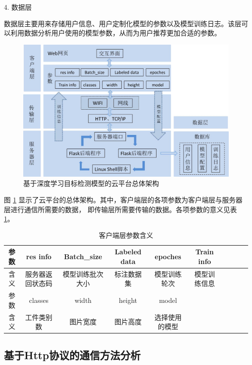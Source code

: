 4. 数据层

数据层主要用来存储用户信息、用户定制化模型的参数以及模型训练日志。该层可以利用数据分析用户使用的模型参数，从而为用户推荐更加合适的参数。

\begin{figure}[htbp]
    \centering
    \includegraphics[width=\textwidth]{pic/chap4/cloudplatform_construct.jpg}
    \caption{基于深度学习目标检测模型的云平台总体架构}
    \label{fig:cloudplatform_construct}
\end{figure}
图 \ref{fig:cloudplatform_construct} 显示了云平台的总体架构。其中，客户端层的各项参数为客户端层与服务器层进行通信所需要的数据，
即传输层所需要传输的数据。各项参数的意义见表 \ref{table:Web:info}。

{
    \begin{table}[htb]
        \caption{客户端层参数含义}
        \label{table:Web:info}
        \centering
        \begin{tabular}[t]{c|c|c|c|c|cc|c|c|c}
            \hline
            参数 & res info & Batch\_size & Labeled data & epoches & Train info \\
            \hline
            含义 & 服务器返回状态码 & 模型训练批次大小 & 标注数据集 & 模型训练轮次 & 模型训练信息\\
            \hline
            参数 & classes & width & height & model \\
            \hline
            含义 & 工件类别数 & 图片宽度 & 图片高度 & 选择使用的模型 \\
            \hline
        \end{tabular}
    \end{table}
}

\subsection{基于Http协议的通信方法分析}

